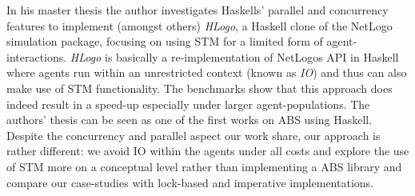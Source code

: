 %
%
%
%
%
%
%
%

In his master thesis \cite{bezirgiannis_improving_2013} the author investigates Haskells' parallel and concurrency features to implement (amongst others) \textit{HLogo}, a Haskell clone of the NetLogo \cite{wilensky_introduction_2015} simulation package, focusing on using STM for a limited form of agent-interactions. \textit{HLogo} is basically a re-implementation of NetLogos API in Haskell where agents run within an unrestricted context (known as \textit{IO}) and thus can also make use of STM functionality. The benchmarks show that this approach does indeed result in a speed-up especially under larger agent-populations. The authors' thesis can be seen as one of the first works on ABS using Haskell. Despite the concurrency and parallel aspect our work share, our approach is rather different: we avoid IO within the agents under all costs and explore the use of STM more on a conceptual level rather than implementing a ABS library and compare our case-studies with lock-based and imperative implementations.

